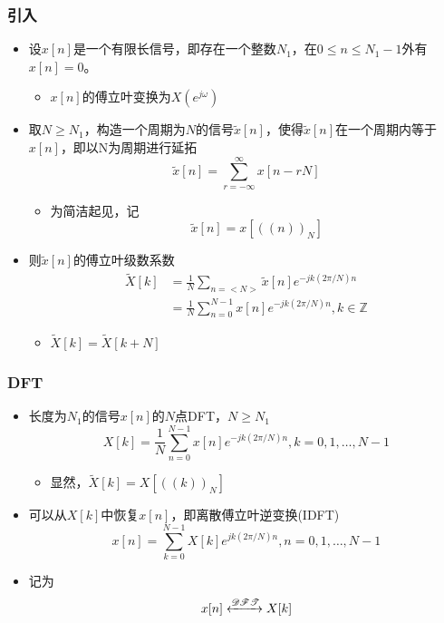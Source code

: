 \documentclass[CJKutf8,xcolor=pdftex,dvipsnames,table]{beamer}
\begin{document}
\begin{CJK*}{UTF8}{song}
  \begin{frame}
    \frametitle{引入}
    \begin{itemize}
    \item 设$x[n]$是一个有限长信号，即存在一个整数$N_1$，在$0\leq n \leq N_1 - 1$外有$x[n]=0$。
    	\begin{itemize}
    	\item $x[n]$的傅立叶变换为$X(e^{j\omega})$
    	\end{itemize}
	\item 取$N\geq N_1$，构造一个周期为$N$的信号$\tilde{x}[n]$，使得$\tilde{x}[n]$在一个周期内等于$x[n]$，即以N为周期进行延拓
		\[
			\tilde{x}[n]=\sum_{r=-\infty}^{\infty} x[n-rN]
		\]
		\begin{itemize}
		\item 为简洁起见，记
		\[
			\tilde{x}[n]=x[((n))_N]
		\]
		\end{itemize}
	\item 则$\tilde{x}[n]$的傅立叶级数系数
		\begin{align*}
			\tilde{X}[k] & = \frac{1}{N}\sum_{n=<N>} \tilde{x}[n] e^{-jk(2\pi/N)n} \\
		    	& = \frac{1}{N}\sum_{n=0}^{N-1} x[n] e^{-jk(2\pi/N)n}, k \in \mathbb{Z}
		\end{align*}
		\begin{itemize}
		\item $\tilde{X}[k]=\tilde{X}[k+N]$
		\end{itemize}
    \end{itemize}
  \end{frame} 	

  \begin{frame}
    \frametitle{DFT}
    \begin{itemize}
	\item 长度为$N_1$的信号$x[n]$的$N$点DFT，$N \geq N_1$
		\[
			X[k] = \frac{1}{N}\sum_{n=0}^{N-1} x[n] e^{-jk(2\pi/N)n}, k=0, 1, \hdots, N-1
		\]
		\begin{itemize}
		\item 显然，$\tilde{X}[k]=X[((k))_N]$
		\end{itemize}
	\item 可以从$X[k]$中恢复$x[n]$，即离散傅立叶逆变换(IDFT)
		\[
			x[n] = \sum_{k=0}^{N-1} X[k] e^{jk(2\pi/N)n}, n=0, 1, \hdots, N-1
		\]
	\item 记为
		\[
			x[n] \xleftrightarrow{\mathscr{DFT}} X[k]
		\]		
    \end{itemize}
  \end{frame} 	
	

\end{CJK*}
\end{document}
